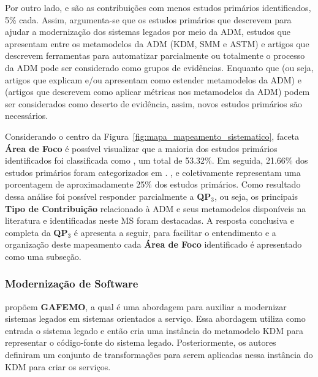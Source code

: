 Por outro lado,  e  são as contribuições com menos estudos primários identificados, 5\% cada. Assim, argumenta-se que os estudos primários que descrevem  para ajudar a modernização dos sistemas legados por meio da ADM, estudos que apresentam  entre os metamodelos da ADM (KDM, SMM e ASTM) e artigos que descrevem ferramentas para automatizar parcialmente ou totalmente o processo da ADM pode ser considerado como grupos de evidências. Enquanto que  (ou seja, artigos que explicam e/ou apresentam como estender metamodelos da ADM) e  (artigos que descrevem como aplicar métricas nos metamodelos da ADM) podem ser considerados como deserto de evidência, assim, novos estudos primários são necessários.

Considerando o centro da Figura~\ref{fig:mapa_mapeamento_sistematico}, faceta \textbf{Área de Foco} é possível visualizar que a maioria dos estudos primários identificados foi classificada como , um total de 53.32\%. Em seguida, 21.66\% dos estudos primários foram categorizados em . ,  e  coletivamente representam uma porcentagem de aproximadamente 25\% dos estudos primários. Como resultado dessa análise foi possível responder parcialmente a \textbf{QP$_3$}, ou seja, os principais \textbf{Tipo de Contribuição} relacionado à ADM e seus metamodelos disponíveis na literatura e identificadas neste MS foram destacadas. A resposta conclusiva e completa da \textbf{QP$_3$} é apresenta a seguir, para facilitar o entendimento e a organização deste mapeamento cada \textbf{Área de Foco} identificado é apresentado como uma subseção.


\subsubsection{Modernização de Software} %
\label{ssub:approach}

 propõem \textbf{GAFEMO}, a qual é uma abordagem para auxiliar a modernizar sistemas legados em sistemas orientados a serviço. Essa abordagem utiliza como entrada o sistema legado e então cria uma instância do metamodelo KDM para representar o código-fonte do sistema legado. Posteriormente, os autores definiram um conjunto de transformações para serem aplicadas nessa instância do KDM para criar os serviços.


